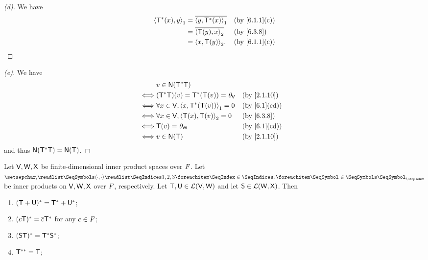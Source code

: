 \begin{proof}[(d)]
	We have
	\begin{align*}
		\inn{\T^*(x), y}_1 & = \conj{\inn{y, \T^*(x)}_1} &  & \by{6.1.1}[c] \\
		                   & = \conj{\inn{\T(y), x}_2}   &  & \by{6.3.8}    \\
		                   & = \inn{x, \T(y)}_2.         &  & \by{6.1.1}[c]
	\end{align*}
\end{proof}

\begin{proof}[(e)]
	We have
	\begin{align*}
		     & v \in \ns{\T^* \T}                                             \\
		\iff & (\T^* \T)(v) = \T^*(\T(v)) = \zv_{\V}        &  & \by{2.1.10}  \\
		\iff & \forall x \in \V, \inn{x, \T^*(\T(v))}_1 = 0 &  & \by{6.1}[cd] \\
		\iff & \forall x \in \V, \inn{\T(x), \T(v)}_2 = 0   &  & \by{6.3.8}   \\
		\iff & \T(v) = \zv_{\W}                             &  & \by{6.1}[cd] \\
		\iff & v \in \ns{\T}                                &  & \by{2.1.10}
	\end{align*}
	and thus \(\ns{\T^* \T} = \ns{\T}\).
\end{proof}

\begin{ex}\label{ex:6.3.16}
	Let \(\mathsf{V}, \mathsf{W}, \mathsf{X}\) be finite-dimensional inner product spaces over \(\mathit{F}\).
	Let \(\seq{\inn{\cdot, \cdot}}{1,2,3}\) be inner products on \(\mathsf{V}, \mathsf{W}, \mathsf{X}\) over \(\mathit{F}\), respectively.
	Let \(\mathsf{T}, \mathsf{U} \in \mathcal{L}(\mathsf{V}, \mathsf{W})\) and let \(\mathsf{S} \in \mathcal{L}(\mathsf{W}, \mathsf{X})\).
	Then
	\begin{enumerate}
		\item \((\mathsf{T} + \mathsf{U})^* = \mathsf{T}^* + \mathsf{U}^*\);
		\item \((c \mathsf{T})^* = \overline{c} \mathsf{T}^*\) for any \(c \in \mathit{F}\);
		\item \((\mathsf{S} \mathsf{T})^* = \mathsf{T}^* \mathsf{S}^*\);
		\item \(\mathsf{T}^{**} = \mathsf{T}\);
	\end{enumerate}
\end{ex}

